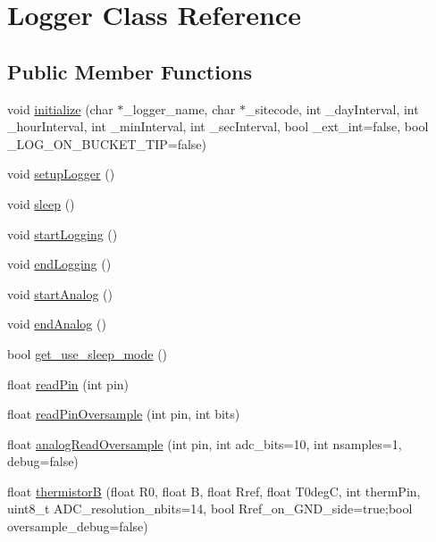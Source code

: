 \hypertarget{classLogger}{}\section{Logger Class Reference}
\label{classLogger}
\subsection*{Public Member Functions}
\begin{DoxyCompactItemize}
\item 
void \hyperlink{classLogger_a9495e2c8e63850f3c7cfcc31e9d73ffe}{initialize} (char $\ast$\+\_\+logger\+\_\+name, char $\ast$\+\_\+sitecode, int \+\_\+day\+Interval, int \+\_\+hour\+Interval, int \+\_\+min\+Interval, int \+\_\+sec\+Interval, bool \+\_\+ext\+\_\+int=false, bool \+\_\+\+L\+O\+G\+\_\+\+O\+N\+\_\+\+B\+U\+C\+K\+E\+T\+\_\+\+T\+IP=false)
\item 
void \hyperlink{classLogger_ab5e0bd543758c65a17b77553a0e9f0c9}{setup\+Logger} ()
\item 
void \hyperlink{classLogger_ad90ff8f29410f6b70cc6334391400a4e}{sleep} ()
\item 
void \hyperlink{classLogger_a4a6c78dd1715b33ae4bbd6f66f116f77}{start\+Logging} ()
\item 
void \hyperlink{classLogger_aa82814d61687debcf3b8dd6f46c9d549}{end\+Logging} ()
\item 
void \hyperlink{classLogger_af936c7f58e23316abb5614cbd31c7ced}{start\+Analog} ()
\item 
void \hyperlink{classLogger_adca7be8a63592263c67f63766680d16f}{end\+Analog} ()
\item 
bool \hyperlink{classLogger_acc758b6fdaac8099c492929aa7f1691d}{get\+\_\+use\+\_\+sleep\+\_\+mode} ()
\item 
float \hyperlink{classLogger_a343fcabefb37e06429865a2e6a6e708a}{read\+Pin} (int pin)
\item 
float \hyperlink{classLogger_a4e67526c65fa865f276a515a200af4aa}{read\+Pin\+Oversample} (int pin, int bits)
\item 
float \hyperlink{classLogger_a73193a90982ddcb31ad0b401ec0e71fa}{analog\+Read\+Oversample} (int pin, int adc\+\_\+bits=10, int nsamples=1, debug=false)
\item 
float \hyperlink{classLogger_a343dbf1edb8745ea9672f579d3e8297e}{thermistorB} (float R0, float B, float Rref, float T0degC, int therm\+Pin, uint8\+\_\+t A\+D\+C\+\_\+resolution\+\_\+nbits=14, bool Rref\+\_\+on\+\_\+\+G\+N\+D\+\_\+side=true;bool oversample\+\_\+debug=false)

\end{DoxyCompactItemize}

